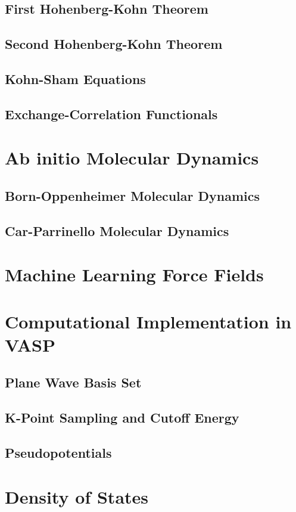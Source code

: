 \subsection{First Hohenberg-Kohn Theorem}

\subsection{Second Hohenberg-Kohn Theorem}

\subsection{Kohn-Sham Equations}

\subsection{Exchange-Correlation Functionals}

\section{Ab initio Molecular Dynamics}

\subsection{Born-Oppenheimer Molecular Dynamics}

\subsection{Car-Parrinello Molecular Dynamics}

\section{Machine Learning Force Fields}

\section{Computational Implementation in VASP}
\subsection{Plane Wave Basis Set}
\subsection{K-Point Sampling and Cutoff Energy}
\subsection{Pseudopotentials}
\section{Density of States}



